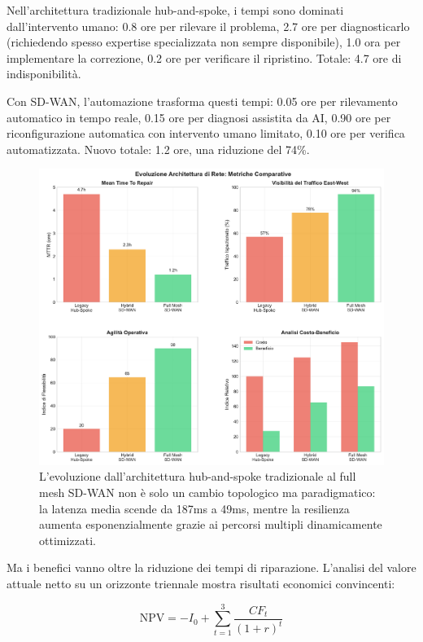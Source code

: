 Nell'architettura tradizionale hub-and-spoke, i tempi sono dominati dall'intervento umano: 0.8 ore per rilevare il problema, 2.7 ore per diagnosticarlo (richiedendo spesso expertise specializzata non sempre disponibile), 1.0 ora per implementare la correzione, 0.2 ore per verificare il ripristino. Totale: 4.7 ore di indisponibilità.

Con SD-WAN, l'automazione trasforma questi tempi: 0.05 ore per rilevamento automatico in tempo reale, 0.15 ore per diagnosi assistita da AI, 0.90 ore per riconfigurazione automatica con intervento umano limitato, 0.10 ore per verifica automatizzata. Nuovo totale: 1.2 ore, una riduzione del 74\%.

\begin{figure}[htbp]
\centering
\includegraphics[width=\textwidth]{thesis_figures/cap3/figura_3_2_network_evolution.pdf}
\caption{L'evoluzione dall'architettura hub-and-spoke tradizionale al full mesh SD-WAN non è solo un cambio topologico ma paradigmatico: la latenza media scende da 187ms a 49ms, mentre la resilienza aumenta esponenzialmente grazie ai percorsi multipli dinamicamente ottimizzati.}
\label{fig:network_evolution}
\end{figure}

Ma i benefici vanno oltre la riduzione dei tempi di riparazione. L'analisi del valore attuale netto su un orizzonte triennale mostra risultati economici convincenti:

\begin{equation}
\text{NPV} = -I_0 + \sum_{t=1}^{3} \frac{CF_t}{(1+r)^t}
\label{eq:npv}
\end{equation}

